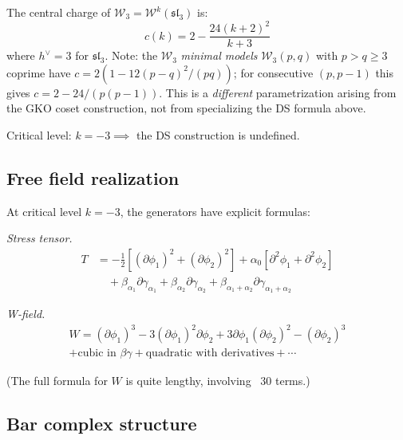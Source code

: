 \begin{proposition}
\label{prop:w3-central-charge}
The central charge of $\mathcal{W}_3 = \mathcal{W}^k(\mathfrak{sl}_3)$ is:
\begin{equation}
c(k) = 2 - \frac{24(k+2)^2}{k+3}
\end{equation}
where $h^\vee = 3$ for $\mathfrak{sl}_3$. Note: the $\mathcal{W}_3$ \emph{minimal models} $\mathcal{W}_3(p,q)$ with $p > q \geq 3$ coprime have $c = 2(1 - 12(p-q)^2/(pq))$; for consecutive $(p, p-1)$ this gives $c = 2 - 24/(p(p-1))$.  This is a \emph{different} parametrization arising from the GKO coset construction, not from specializing the DS formula above.

Critical level: $k = -3 \implies$ the DS construction is undefined.
\end{proposition}

\subsection{Free field realization}

\begin{theorem}\label{thm:w3-wakimoto}
At critical level $k = -3$, the generators have explicit formulas:

\emph{Stress tensor.}
\begin{align}
T &= -\frac{1}{2}[(\partial\phi_1)^2 + (\partial\phi_2)^2] + \alpha_0[\partial^2\phi_1 + \partial^2\phi_2] \\
&\quad + \beta_{\alpha_1}\partial\gamma_{\alpha_1} + \beta_{\alpha_2}\partial\gamma_{\alpha_2} + \beta_{\alpha_1+\alpha_2}\partial\gamma_{\alpha_1+\alpha_2}
\end{align}

\emph{W-field.}
\begin{multline}
W = (\partial\phi_1)^3 - 3(\partial\phi_1)^2\partial\phi_2 + 3\partial\phi_1(\partial\phi_2)^2 - (\partial\phi_2)^3 \\
+ \text{cubic in } \beta\gamma + \text{quadratic with derivatives} + \cdots
\end{multline}

(The full formula for $W$ is quite lengthy, involving ~30 terms.)
\end{theorem}

\subsection{Bar complex structure}


